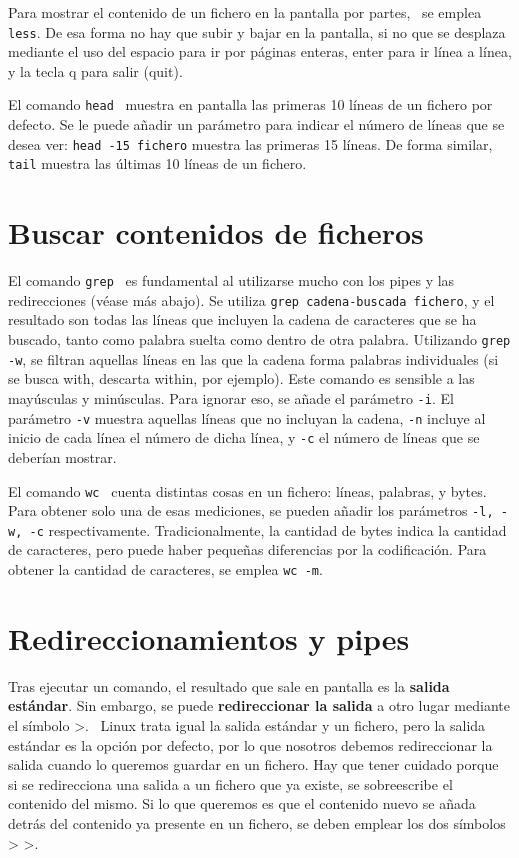 Para mostrar el contenido de un fichero en la pantalla por partes,  \ se emplea \texttt{less}. De esa forma no hay que subir y bajar en la pantalla, si no que se desplaza mediante el uso del espacio para ir por páginas enteras, enter para ir línea a línea, y la tecla q para salir (quit). 

El comando \texttt{head}  \ muestra en pantalla las primeras 10 líneas de un fichero por defecto. Se le puede añadir un parámetro para indicar el número de líneas que se desea ver: \texttt{head -15 fichero} muestra las primeras 15 líneas. De forma similar, \texttt{tail} muestra las últimas 10 líneas de un fichero.

\section{Buscar contenidos de ficheros}
El comando \texttt{grep}  \ es fundamental al utilizarse mucho con los pipes y las redirecciones (véase más abajo). Se utiliza \texttt{grep cadena-buscada fichero}, y el resultado son todas las líneas que incluyen la cadena de caracteres que se ha buscado, tanto como palabra suelta como dentro de otra palabra. Utilizando \texttt{grep -w}, se filtran aquellas líneas en las que la cadena forma palabras individuales (si se busca with, descarta within, por ejemplo). Este comando es sensible a las mayúsculas y minúsculas. Para ignorar eso, se añade el parámetro \texttt{-i}. El parámetro \texttt{-v} muestra aquellas líneas que no incluyan la cadena, \texttt{-n} incluye al inicio de cada línea el número de dicha línea, y \texttt{-c} el número de líneas que se deberían mostrar.

El comando \texttt{wc} \marginpar[\footnotesize wc] \ cuenta distintas cosas en un fichero: líneas, palabras, y bytes. Para obtener solo una de esas mediciones, se pueden añadir los parámetros \texttt{-l, -w, -c} respectivamente. Tradicionalmente, la cantidad de bytes indica la cantidad de caracteres, pero puede haber pequeñas diferencias por la codificación. Para obtener la cantidad de caracteres, se emplea \texttt{wc -m}.

\section{Redireccionamientos y pipes}
Tras ejecutar un comando, el resultado que sale en pantalla es la \textbf{salida estándar}. Sin embargo, se puede \textbf{redireccionar la salida} a otro lugar mediante el símbolo >. \marginpar[\footnotesize > \\ > >] \ Linux trata igual la salida estándar y un fichero, pero la salida estándar es la opción por defecto, por lo que nosotros debemos redireccionar la salida cuando lo queremos guardar en un fichero. Hay que tener cuidado porque si se redirecciona una salida a un fichero que ya existe, se sobreescribe el contenido del mismo. Si lo que queremos es que el contenido nuevo se añada detrás del contenido ya presente en un fichero, se deben emplear los dos símbolos > >. 


